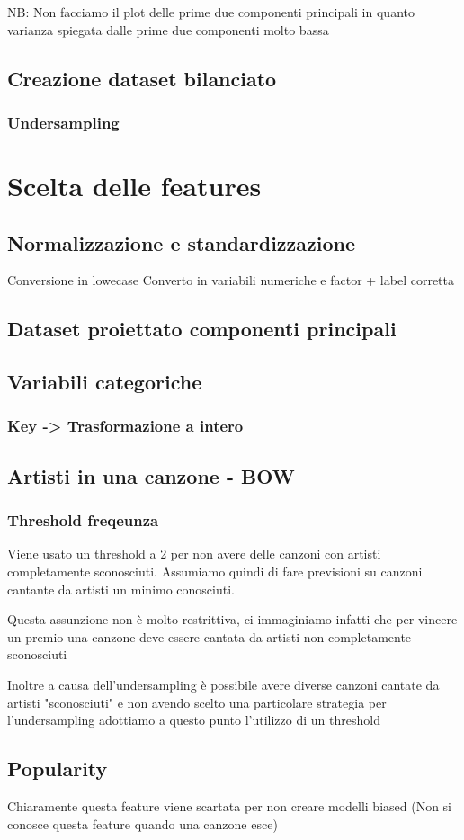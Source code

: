 NB: Non facciamo il plot delle prime due componenti principali in quanto varianza spiegata dalle prime due componenti molto bassa

\subsection{Creazione dataset bilanciato}
\subsubsection{Undersampling}


\section{Scelta delle features}
\subsection{Normalizzazione e standardizzazione}
Conversione in lowecase
Converto in variabili numeriche e factor + label corretta
\subsection{Dataset proiettato componenti principali}
\subsection{Variabili categoriche}
\subsubsection{Key -> Trasformazione a intero}
\subsection{Artisti in una canzone - BOW}
\subsubsection{Threshold freqeunza}
Viene usato un threshold a 2 per non avere delle canzoni con artisti completamente sconosciuti. Assumiamo quindi di fare previsioni su canzoni cantante da artisti un minimo conosciuti.

Questa assunzione non è molto restrittiva, ci immaginiamo infatti che per vincere un premio una canzone deve essere cantata da artisti non completamente sconosciuti

Inoltre a causa dell'undersampling è possibile avere diverse canzoni cantate da artisti "sconosciuti" e non avendo scelto una particolare strategia per l'undersampling adottiamo a questo punto l'utilizzo di un threshold

\subsection{Popularity}
Chiaramente questa feature viene scartata per non creare modelli biased (Non si conosce questa feature quando una canzone esce)
